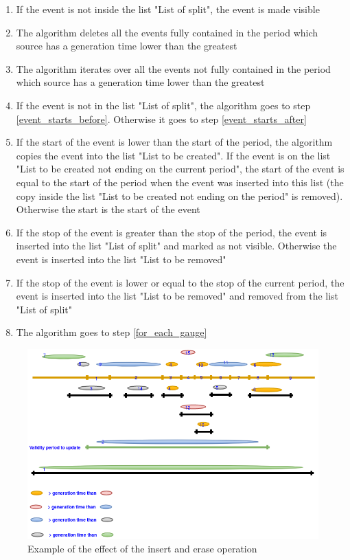 \begin{enumerate}
\item If the event is not inside the list "List of split", the event is made visible
\item The algorithm deletes all the events fully contained in the period which source has a generation time lower than the greatest
\item The algorithm iterates over all the events not fully contained in the period which source has a generation time lower than the greatest
\item If the event is not in the list "List of split", the algorithm goes to step \ref{event_starts_before}. Otherwise it goes to step \ref{event_starts_after}
\item \label{event_starts_before} If the start of the event is lower than the start of the period, the algorithm copies the event into the list "List to be created". If the event is on the list "List to be created not ending on the current period", the start of the event is equal to the start of the period when the event was inserted into this list (the copy inside the list "List to be created not ending on the period" is removed). Otherwise the start is the start of the event
\item If the stop of the event is greater than the stop of the period, the event is inserted into the list "List of split" and marked as not visible. Otherwise the event is inserted into the list "List to be removed"
\item \label{event_starts_after} If the stop of the event is lower or equal to the stop of the current period, the event is inserted into the list "List to be removed" and removed from the list "List of split"
\item The algorithm goes to step \ref{for_each_gauge}
\end{enumerate}

\begin{figure}[H]
  \begin{center}
	\centering\includegraphics[width=150mm]{../fig/insert_and_erase_algorithm.png}
	\caption{Example of the effect of the insert and erase operation}
	\label{fg:insert_and_erase_algorithm}
  \end{center}
\end{figure}

